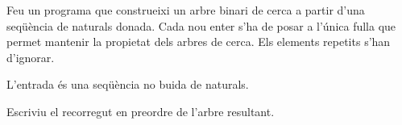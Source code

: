 


\Statement

Feu un programa que construeixi un arbre binari de cerca
a partir d'una seqüència de naturals donada.
Cada nou enter s'ha de posar a l'única fulla
que permet mantenir la propietat dels arbres de cerca.
Els elements repetits s'han d'ignorar.



\Input

L'entrada és una seqüència no buida de naturals.



\Output

Escriviu el recorregut en preordre de l'arbre resultant.


\SampleOneCol
